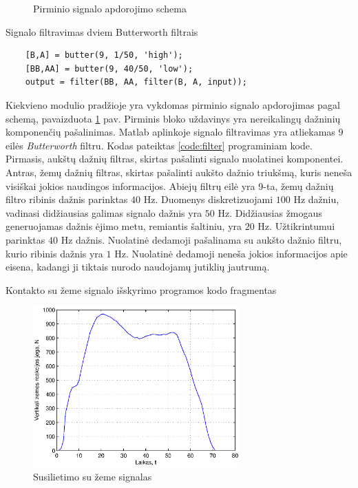 \documentclass[]{vgtuef}
\begin{document}
\begin{figure}
  \centering
  
  \caption{Pirminio signalo apdorojimo schema}
  \label{fig:pre_phase}
\end{figure}

\begin{cfigure}[b]
  \centering
  \caption{Signalo filtravimas dviem Butterworth filtrais}
  \label{code:filter}
  \begin{lstlisting}
    [B,A] = butter(9, 1/50, 'high');
    [BB,AA] = butter(9, 40/50, 'low');
    output = filter(BB, AA, filter(B, A, input));
  \end{lstlisting}
\end{cfigure}

Kiekvieno modulio pradžioje yra vykdomas pirminio signalo apdorojimas pagal schemą, pavaizduota \ref{fig:pre_phase} pav. Pirminis bloko uždavinys yra nereikalingų dažninių komponenčių pašalinimas. Matlab aplinkoje signalo filtravimas yra atliekamas $9$ eilės \textit{Butterworth} filtru. Kodas pateiktas \ref{code:filter} programiniam kode. Pirmasis, aukštų dažnių filtras, skirtas pašalinti signalo nuolatinei komponentei. Antras, žemų dažnių filtras, skirtas pašalinti aukšto dažnio triukšmą, kuris neneša visiškai jokios naudingos informacijos. Abiejų filtrų eilė yra 9-ta, žemų dažnių filtro ribinis dažnis parinktas $40$ Hz. Duomenys diskretizuojami $100$ Hz dažniu, vadinasi didžiausias galimas signalo dažnis yra $50$ Hz. Didžiausias žmogaus generuojamas dažnis ėjimo metu, remiantis šaltiniu, yra $20$ Hz. Užtikrintumui parinktas $40$ Hz dažnis. Nuolatinė dedamoji pašalinama su aukšto dažnio filtru, kurio ribinis dažnis yra $1$ Hz. Nuolatinė dedamoji neneša jokios informacijos apie eisena, kadangi ji tiktais nurodo naudojamų jutiklių jautrumą.

\begin{cfigure}
  \centering
  \caption{Kontakto su žeme signalo išskyrimo programos kodo fragmentas}
  \label{code:signal_extraction}
  
\end{cfigure}

\begin{figure}
  \centering
  \includegraphics[width=300px]{figures/09_sample_stance_phase.eps}
  \caption{Susilietimo su žeme signalas}
  \label{fig:stance_phase}
\end{figure}
\end{document}
